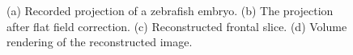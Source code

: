 \begin{enumerate}
\begin{figure}[!htbp]
\centering
{}
\caption{(a) Recorded projection of a zebrafish embryo. (b) The projection after flat field correction. (c) Reconstructed frontal slice. (d) Volume rendering of the reconstructed image.}
\label{fig::tomography_fish}
\end{figure}


\end{enumerate}
